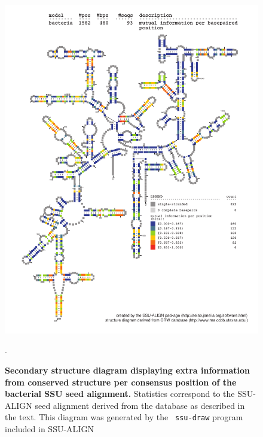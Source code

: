\begin{figure}
\begin{center}
\includegraphics[width=5.7in]{Figures/bacteria-0p1-mutinfo}
\end{center}
\caption[Secondary structure diagram displaying extra information 
  from conserved structure per consensus position of the bacterial SSU seed
  alignment]{\textbf{Secondary structure diagram displaying extra
  information from conserved structure per consensus position of the bacterial SSU seed
  alignment.} Statistics correspond to the SSU-ALIGN seed
  alignment derived from the  database \cite{CannoneGutell02}
  as described in the text. This diagram was generated by the {\tt
  ssu-draw} program included in SSU-ALIGN}.
\label{fig:bacsinfo}
\end{figure}

\newpage 

